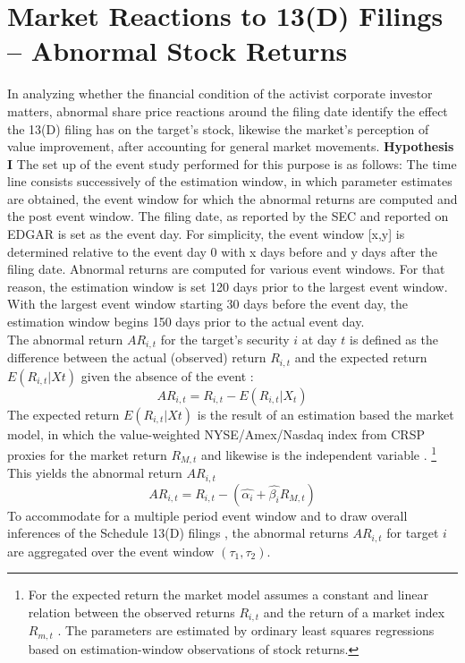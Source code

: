 \documentclass[12pt]{article}
\begin{document}
\section{Market Reactions to 13(D) Filings -- Abnormal Stock Returns}
In analyzing whether the financial condition of the activist corporate investor matters, abnormal share price reactions around the filing date identify the effect the 13(D) filing has on the target's stock, likewise the market's perception of value improvement, after accounting for general market movements.
\textbf{Hypothesis I}
The set up of the event study performed for this purpose is as follows: The time line consists successively of the estimation window, in which parameter estimates are obtained, the event window for which the abnormal returns are computed and the post event window. 
The filing date, as reported by the SEC and reported on EDGAR is set as the event day. For simplicity, the event window [x,y] is determined relative to the event day 0 with x days before and y days after the filing date. Abnormal returns are computed for various event windows. For that reason, the estimation window is set 120 days prior to the largest event window. With the largest event window starting 30 days before the event day, the estimation window begins 150 days prior to the actual event day.\\
The abnormal return $AR_{i,t}$ for the target's security $i$ at day $t$ is defined as the difference between the actual (observed) return $R_{i,t}$ and the expected return $E(R_{i,t}|X{t})$ given the absence of the event \citep[p.15]{MacKinlay1997}:
	\begin{equation}\label{eq:1}
		AR_{i,t}=R_{i,t}-E(R_{i,t}|X_{t})
	\end{equation}
The expected return $E(R_{i,t}|X{t})$ is the result of an estimation based the market model, in which the value-weighted NYSE/Amex/Nasdaq index from CRSP proxies for the market return $R_{M,t}$ and likewise is the independent variable \citep[p.18]{MacKinlay1997}.
	\footnote{For the expected return the market model assumes a constant and linear relation between the observed returns $R_{i,t}$ and the return of a market index $R_{m,t}$ \citep[p.18]{MacKinlay1997}. The parameters are estimated by ordinary least squares regressions based on estimation-window observations of stock returns.}
This yields the abnormal return $AR_{i,t}$
	\begin{equation}\label{eq:2}
		AR_{i,t}=R_{i,t}-(\hat{\alpha_{i}}+\hat{\beta_{i}}R_{M,t})
	\end{equation}
To accommodate for a multiple period event window and to draw overall inferences of the Schedule 13(D) filings \citep[p.21]{MacKinlay1997}, the abnormal returns $AR_{i,t}$ for target $i$ are aggregated over the event window $(\tau_1,\tau_2)$. 
\end{document}
